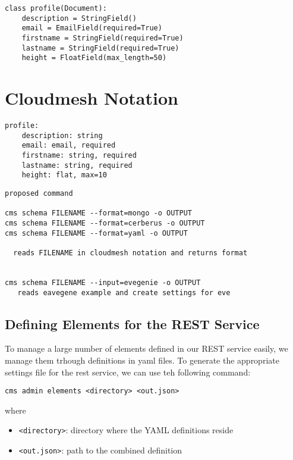 \documentclass[9pt,twocolumn,twoside]{styles/osajnl}
\begin{document}
\begin{Verbatim}
class profile(Document):
    description = StringField()
    email = EmailField(required=True)
    firstname = StringField(required=True)
    lastname = StringField(required=True)
    height = FloatField(max_length=50)
\end{Verbatim}

\section{Cloudmesh Notation}

\begin{Verbatim}
profile:
    description: string
    email: email, required
    firstname: string, required
    lastname: string, required
    height: flat, max=10
\end{Verbatim}

\begin{Verbatim}
proposed command

cms schema FILENAME --format=mongo -o OUTPUT
cms schema FILENAME --format=cerberus -o OUTPUT
cms schema FILENAME --format=yaml -o OUTPUT

  reads FILENAME in cloudmesh notation and returns format


cms schema FILENAME --input=evegenie -o OUTPUT
   reads eavegene example and create settings for eve
\end{Verbatim}


\subsection{Defining Elements for the REST Service}

To manage a large number of elements defined in our REST service
easily, we manage them trhough definitions in yaml files. To generate
the appropriate settings file for the rest service, we can use teh
following command:

\begin{verbatim}
cms admin elements <directory> <out.json>
\end{verbatim}

where

\begin{itemize}
\item \verb+<directory>+: directory where the YAML definitions reside
\item \verb+<out.json>+: path to the combined definition
\end{itemize}
\end{document}

